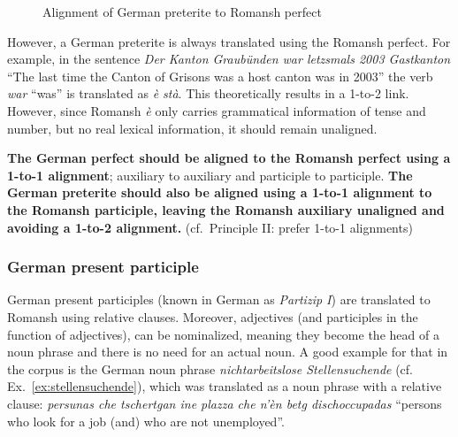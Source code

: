 \begin{figure}
\centering
{}       

\vspace*{1cm}

             
\caption{Alignment of German preterite to Romansh perfect}
\label{fig:pret-perf}
\end{figure}

However, a German preterite is always translated using the Romansh perfect. 
For example, in the sentence \emph{Der Kanton Graubünden war letzsmals 2003 Gastkanton} \enquote{The last time the Canton of Grisons was a host canton was in 2003} the verb \emph{war} \enquote{was} is translated as \emph{è stà}. 
This theoretically results in a 1-to-2 link. 
However, since Romansh \emph{è} only carries grammatical information of tense and number, but no real lexical information, it should remain unaligned. 

\textbf{The German perfect should be aligned to the Romansh perfect using a 1-to-1 alignment}; auxiliary to auxiliary and participle to participle. 
\textbf{The German preterite should also be aligned using a 1-to-1 alignment to the Romansh participle, leaving the Romansh auxiliary unaligned and avoiding a 1-to-2 alignment. 
} (cf.~Principle II: prefer 1-to-1 alignments)

\subsubsection{German present participle}
German present participles (known in German as \emph{Partizip I}) are translated to Romansh using relative clauses. Moreover, adjectives (and participles in the function of adjectives), can be nominalized, meaning they become the head of a noun phrase and there is no need for an actual noun. 
A good example for that in the corpus is the German noun phrase \emph{nichtarbeitslose Stellensuchende} (cf. Ex.~\ref{ex:stellensuchende}), which was translated as a noun phrase with a relative clause: \emph{persunas che tschertgan ine plazza che n'èn betg dischoccupadas} \enquote{persons who look for a job (and) who are not unemployed}.



